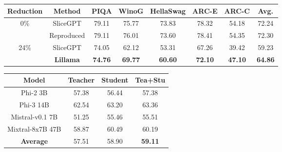 \documentclass[11pt]{article}
\begin{document}
\begin{figure}[ht]
    \begin{minipage}[c]{.56\textwidth}
        \fontsize{8.1pt}{8.1pt}\selectfont
        \centering
        \addtolength{\tabcolsep}{-0.55em}
        \begin{tabular}{cccccccc}
            \toprule
            \textbf{Reduction} & \textbf{Method} & \textbf{PIQA} & \textbf{WinoG} & \textbf{HellaSwag} & \textbf{ARC-E} & \textbf{ARC-C} & \textbf{Avg.} \\
            \midrule
            \multirow{2}{*}{0\%} 
            & SliceGPT & 79.11 & 75.77 & 73.83 & 78.32 & 54.18 & 72.24 \\
            & Reproduced & 79.11 & 76.01 & 73.60 & 78.41 & 54.35 & 72.30 \\
            \midrule
            \multirow{2}{*}{24\%} 
            & SliceGPT & 74.05 & 62.12 & 53.31 & 67.26 & 39.42 & 59.23 \\
            & \textbf{Lillama} & \textbf{74.76} & \textbf{69.77} & \textbf{60.60} & \textbf{72.10} & \textbf{47.10} & \textbf{64.86} \\
            \bottomrule
        \end{tabular}
        \label{tab:comparisons}

    \end{minipage}
    \hfill
    \begin{minipage}[c]{.38\textwidth}
        \fontsize{8.8pt}{8.8pt}\selectfont
        \centering
        \addtolength{\tabcolsep}{-0.50em}
            \begin{tabular}{cccc}
            \toprule
            \textbf{Model} & \textbf{Teacher} & \textbf{Student} & \textbf{Tea+Stu} \\ 
            \midrule
            Phi-2 3B & 57.38 & 56.44 & 57.38 \\
            Phi-3 14B & 62.54 & 63.20 & 63.36 \\
            Mistral-v0.1 7B & 51.25 & 55.46 & 55.51 \\ 
            Mixtral-8x7B 47B & 58.87 & 60.49 & 60.19 \\ 
            \midrule
            \textbf{Average} & 57.51 & 58.90 & \textbf{59.11} \\
            \bottomrule
            \end{tabular}
        \label{tab:losses}
    \end{minipage}
\end{figure}
\end{document}
